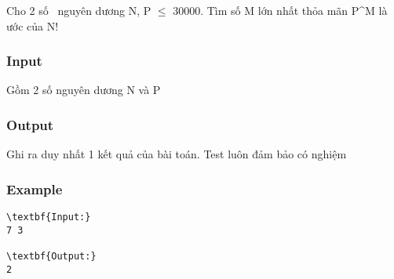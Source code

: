 



   Cho 2 số  nguyên dương N, P  $\le$  30000. Tìm số M lớn nhất thỏa mãn P^M là ước của N!  

\subsubsection{   Input  }

   Gồm 2 số nguyên dương N và P  

\subsubsection{   Output  }

   Ghi ra duy nhất 1 kết quả của bài toán. Test luôn đảm bảo có nghiệm  

\subsubsection{   Example  }
\begin{verbatim}
\textbf{Input:}
7 3

\textbf{Output:}
2\end{verbatim}
